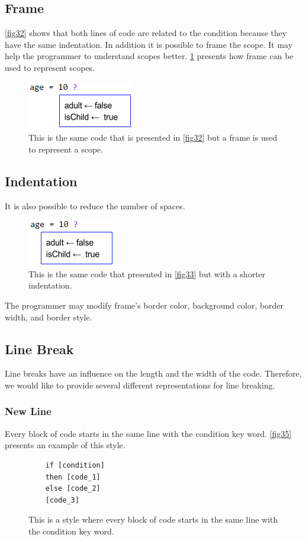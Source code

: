 \subsection{Frame}
\autoref{fig32} shows that both lines of code are related to the condition because they have the same indentation. In addition it is possible to frame the scope. It may help the programmer to understand scopes better. \ref{fig33} presents how frame can be used to represent scopes.
\begin{figure}[H]
	\includegraphics{"./fig/Condition With Frame"}
	\caption{This is the same code that is presented in \autoref{fig32} but a frame is used to represent a scope.}
	\label{fig33}
\end{figure}
\subsection{Indentation}
It is also possible to reduce the number of spaces.
\begin{figure}[H]
	\includegraphics{"./fig/Condition With Frame and short Indentation"}
	\caption{This is the same code that presented in \autoref{fig33} but with a shorter indentation.}
	\label{fig34}
\end{figure}
The programmer may modify frame's border color, background color, border width, and border style.
\subsection{Line Break}
Line breaks have an influence on the length and the width of the code. Therefore, we would like to provide several different representations for line breaking.
\subsubsection{New Line}
Every block of code starts in the same line with the condition key word. \autoref{fig35} presents an example of this style.
\begin{figure}[H]
	\begin{lstlisting}
	if [condition]
	then [code_1]
	else [code_2]
	[code_3]
	\end{lstlisting}
	\caption{This is a style where every block of code starts in the same line with the condition key word.}
	\label{fig35}
\end{figure}
